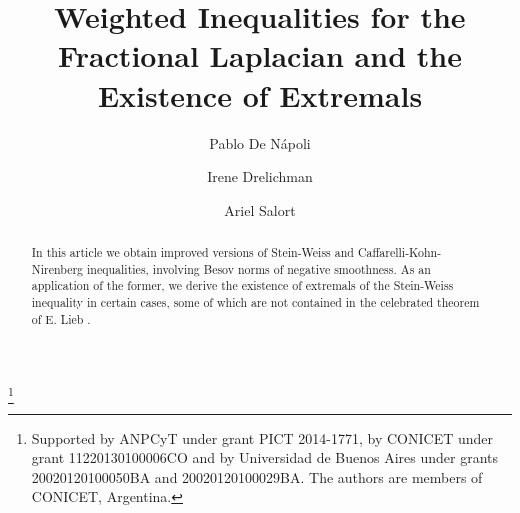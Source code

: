 \documentclass[12pt]{amsart}
\begin{document}
\title [Weighted Inequalities for the Fractional Laplacian]
{Weighted Inequalities for the Fractional Laplacian and the Existence of Extremals}

\author{Pablo   De N\'apoli}
\address{IMAS (UBA-CONICET) and Departamento de Matem\'atica\\
Facultad de Ciencias Exactas y Naturales\\
Universidad de Buenos Aires\\
Ciudad Universitaria\\
1428 Buenos Aires\\
Argentina}


\author{Irene Drelichman}
\address{IMAS (UBA-CONICET) \\
Facultad de Ciencias Exactas y Naturales\\
Universidad de Buenos Aires\\
Ciudad Universitaria\\
1428 Buenos Aires\\
Argentina}


\author{Ariel Salort}
\address{IMAS (UBA-CONICET) and Departamento de Matem\'atica\\
Facultad de Ciencias Exactas y Naturales\\
Universidad de Buenos Aires\\
Ciudad Universitaria\\
1428 Buenos Aires\\
Argentina}


\thanks{Supported by ANPCyT under grant PICT 2014-1771, by CONICET under grant 11220130100006CO  and by Universidad de Buenos Aires under grants 20020120100050BA and 20020120100029BA. The authors are members of
CONICET, Argentina.}




\begin{abstract}
In this article we obtain  improved versions of  Stein-Weiss and  Caffarelli-Kohn-Nirenberg inequalities,  involving  Besov norms of negative smoothness. As an application of the former,
we derive the existence of extremals of the Stein-Weiss inequality in certain
cases, some of which are not contained in the celebrated theorem of E. Lieb \cite{Lieb}.
\end{abstract}
\end{document}
